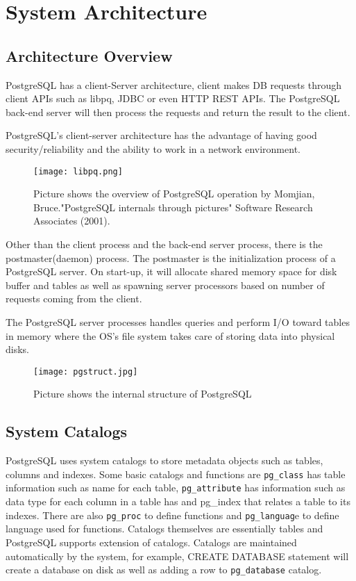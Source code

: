 \documentclass[a4paper]{article}
\begin{document}
\section{System Architecture}
\subsection{Architecture Overview}
PostgreSQL has a client-Server architecture, client makes DB requests through client APIs such as libpq, JDBC or even HTTP REST APIs. The PostgreSQL back-end server will then process the requests and return the result to the client\cite{10}. 

PostgreSQL's client-server architecture has the advantage of having good security/reliability and the ability to work in a network environment.

\begin{figure}[H]
\centering
\texttt{[image: libpq.png]}
\caption{Picture shows the overview of PostgreSQL operation by Momjian, Bruce."PostgreSQL internals through pictures" Software Research Associates (2001).}
\end{figure}

Other than the client process and the back-end server process, there is the postmaster(daemon) process. The postmaster is the initialization process of a PostgreSQL server. On start-up, it will allocate shared memory space for disk buffer and tables as well as spawning server processors based on number of requests coming from the client\cite{14}.

The PostgreSQL server processes handles queries and perform I/O toward tables in memory where the OS's file system takes care of storing data into physical disks. 

\begin{figure}[H]
\centering
\texttt{[image: pgstruct.jpg]}
\caption{Picture shows the internal structure of PostgreSQL\cite{12}}
\end{figure}

\subsection{System Catalogs}
PostgreSQL uses system catalogs to store metadata objects such as tables, columns and indexes. Some basic catalogs and functions are \texttt{pg\_class} has table information such as name for each table, \texttt{pg\_attribute} has information such as data type for each column in a table has and pg\_index that relates a table to its indexes. There are also \texttt{pg\_proc} to define functions and \texttt{pg\_languag}e to define language used for functions. Catalogs themselves are essentially tables and PostgreSQL supports extension of catalogs\cite{10}. Catalogs are maintained automatically by the system, for example, CREATE DATABASE statement will create a database on disk as well as adding a row to \texttt{pg\_database} catalog\cite{1}.
\end{document}
